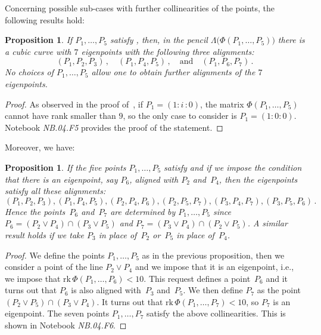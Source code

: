 \documentclass[a4paper, 11pt, reqno]{amsart}
\theoremstyle{plain}
\newtheorem{prop}[lemma]{Proposition}
\theoremstyle{definition}
\newcommand{\nb}[2]{\textsl{{NB}.{#1}.{#2}}}
\newcommand{\iii}{\textit{i}\,}
\newcommand{\rk}{\ensuremath{\mathrm{rk}}}
\begin{document}
Concerning possible sub-cases with further collinearities of the points,
the following results hold:
\begin{prop}
\label{proposition:three_d_three_alignments}
If $P_1, \dots, P_5$ satisfy ,
then, in the pencil $\Lambda \bigl( \Phi(P_1, \dotsc, P_5)\bigr)$ there is
a cubic curve with $7$ eigenpoints with the following three alignments:
%
\[
 (P_1, P_2, P_3) \,, \quad (P_1, P_4, P_5) \,, \quad \text{and} \quad (P_1, P_6, P_7) \,.
\]
%
No choices of $P_1, \dots, P_5$ allow one to obtain further alignments of the $7$ eigenpoints.
\end{prop}
%
\begin{proof}
As observed in the proof of~, if $P_1 = (1: \iii: 0)$,
the matrix
$\Phi(P_1, \dots, P_5)$ cannot have rank smaller than $9$, so the only
case to consider is $P_1 = (1: 0: 0)$.
Notebook \nb{04}{F5} provides the proof of the statement.
\end{proof}
%
Moreover, we have:
%
\begin{prop}
\label{proposition:d2_6align}
If the five points $P_1, \dots, P_5$ satisfy 
and if we impose the condition that there is an eigenpoint, say $P_6$, aligned with $P_2$ and~$P_4$, then the eigenpoints satisfy all these
alignments:
%
\[
  (P_1, P_2, P_3), (P_1, P_4, P_5),
  (P_2, P_4, P_6), (P_2, P_5, P_7),
  (P_3, P_4, P_7), (P_3, P_5, P_6) \,.
\]
%
Hence the points~$P_6$ and~$P_7$ are determined by $P_1, \dots, P_5$
since
$P_6 = (P_2 \vee P_4) \cap (P_3 \vee P_5)$
and $P_7 = (P_3 \vee P_4) \cap (P_2 \vee P_5)$.
A similar result holds if we take $P_3$ in place of~$P_2$ or~$P_5$
in place of~$P_4$.
\end{prop}
%
\begin{proof}
We define the points $P_1, \dots, P_5$ as in the previous proposition, then 
we consider a point of the line $P_2 \vee P_4$ and we impose that it is 
an eigenpoint, i.e., we impose that $\rk \, \Phi(P_1, \dotsc, P_6) < 10$.
This request defines a point~$P_6$ and it turns out that $P_6$ is also aligned 
with~$P_3$ and~$P_5$. We then define $P_7$ as the point 
$(P_2 \vee P_5) \cap (P_3 \vee P_4)$. It turns out that 
$\rk \, \Phi(P_1, \dots, P_7) < 10$, so $P_7$ is an eigenpoint. The seven 
points $P_1, \dotsc, P_7$ satisfy the above collinearities.
This is shown in Notebook \nb{04}{F6}.
\end{proof}
\end{document}
